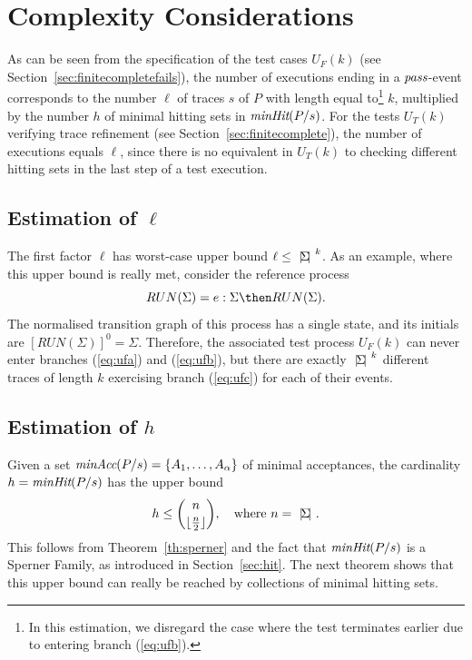 \section{Complexity Considerations}
\label{sec:complexity}


 
As can be seen from the specification of the test cases $U_F(k)$ 
(see Section~\ref{sec:finitecompletefails}), the number of
executions ending in a ${\text{\it pass}}$-event corresponds to the number $\ell$ of traces $s$
of $P$ with length equal to\footnote{In this estimation, we disregard
the case where the test
terminates earlier due to entering branch (\ref{eq:ufb}).} $k$,
multiplied by the number $h$ of minimal hitting sets in
$\text{\it minHit}(P/s)$. For the tests $U_T(k)$ verifying trace refinement (see Section~\ref{sec:finitecomplete}), the number of executions equals $\ell$, since
there is no equivalent in $U_T(k)$ 
to checking different hitting sets in the last step of a 
test execution.



\subsection{Estimation of $\ell$}
The first factor $\ell$
has worst-case upper bound $\ell\le {~|\! \Sigma\!|~}^k$. As an example, where this upper bound 
is really met, consider the reference process
\[
RUN(\Sigma) = e:\Sigma \then RUN(\Sigma).
\]
The normalised transition graph of this process has a single state, and its initials
are $[RUN(\Sigma)]^0 = \Sigma$. Therefore, the associated test process $U_F(k)$ can 
never enter branches (\ref{eq:ufa}) and (\ref{eq:ufb}), but there are exactly 
${~|\! \Sigma\!|~}^k$ different traces of length $k$ exercising branch (\ref{eq:ufc})
for each of their events.

\subsection{Estimation of $h$}
Given a set $\text{\it minAcc}(P/s) = \{ A_1,\dots, A_\alpha \}$ of   minimal
acceptances, the cardinality   $h = \text{\it minHit}(P/s)$ has the upper bound
\[
h \le \binom{n}{\lfloor\frac{n}{2}\rfloor}, \quad \text{where $n = {~|\! \Sigma\!|~}$.}
\]
This follows from Theorem~\ref{th:sperner} and the fact that $\text{\it minHit}(P/s)$ is a 
Sperner Family, as introduced in Section~\ref{sec:hit}. The next theorem shows that this
upper bound can really be reached by collections of minimal hitting sets.

